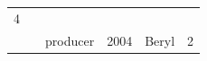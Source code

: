 \begin{longtable}[]{@{}lllrlr@{}}
\begin{minipage}[t]{0.04\columnwidth}
4\strut
\end{minipage}\tabularnewline
\begin{minipage}[t]{0.11\columnwidth}\raggedright\strut
\strut
\end{minipage} & \begin{minipage}[t]{0.08\columnwidth}\raggedright\strut
\strut
\end{minipage} & \begin{minipage}[t]{0.12\columnwidth}\raggedright\strut
producer\strut
\end{minipage} & \begin{minipage}[t]{0.19\columnwidth}\raggedleft\strut
2004\strut
\end{minipage} & \begin{minipage}[t]{0.29\columnwidth}\raggedright\strut
Beryl\strut
\end{minipage} & \begin{minipage}[t]{0.04\columnwidth}\raggedleft\strut
2\strut
\end{minipage}\tabularnewline
\bottomrule
\end{longtable}

